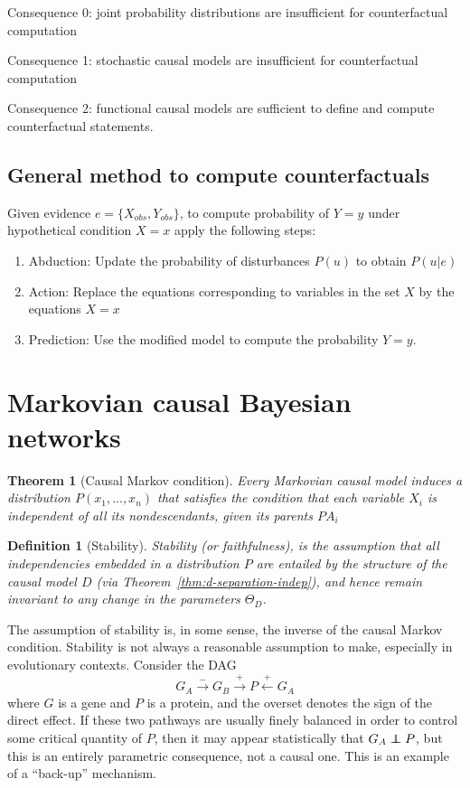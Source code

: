 \documentclass[11pt]{article}
\numberwithin{equation}{section}
\newcommand\indep{\protect\mathpalette{\protect\independenT}{\perp}}
\def\independenT#1#2{\mathrel{\rlap{$#1#2$}\mkern2mu{#1#2}}}
\newtheorem{thm}{Theorem}[section]
\newtheorem{defn}{Definition}[section]
\begin{document}
Consequence 0: joint probability distributions are insufficient for counterfactual computation

Consequence 1: stochastic causal models are insufficient for counterfactual computation

Consequence 2: functional causal models are sufficient to define and compute counterfactual statements.

\subsection{General method to compute counterfactuals}
Given evidence $e=\{X_{obs}, Y_{obs}\}$, to compute probability of $Y=y$ under hypothetical condition $X=x$ apply the following steps:
\begin{enumerate}[noitemsep]
\item Abduction: Update the probability of disturbances $P(u)$ to obtain $P(u|e)$
\item Action: Replace the equations corresponding to variables in the set $X$ by the equations $X=x$
\item Prediction: Use the modified model to compute the probability $Y=y$.
\end{enumerate}

\section{Markovian causal Bayesian networks}

\begin{thm}[Causal Markov condition]
Every Markovian causal model induces a distribution $P(x_1,...,x_n)$ that satisfies the condition that each variable $X_i$ is independent of all its nondescendants, given its parents $PA_i$
\end{thm}

\begin{defn}[Stability]
Stability (or faithfulness), is the assumption that all independencies embedded in a distribution $P$ are entailed by the structure of the causal model $D$ (via Theorem~\ref{thm:d-separation-indep}), and hence remain invariant to any change in the parameters $\Theta_D$.
\end{defn}

The assumption of stability is, in some sense, the inverse of the causal Markov condition. Stability is not always a reasonable assumption to make, especially in evolutionary contexts. Consider the DAG 
\begin{equation}
G_A \overset{-}{\rightarrow} G_B \overset{+}{\rightarrow} P \overset{+}{\leftarrow} G_A
\end{equation}
where $G$ is a gene and $P$ is a protein, and the overset denotes the sign of the direct effect. If these two pathways are usually finely balanced in order to control some critical quantity of $P$, then it may appear statistically that $G_A \indep P$, but this is an entirely parametric consequence, not a causal one. This is an example of a ``back-up'' mechanism.
\end{document}

